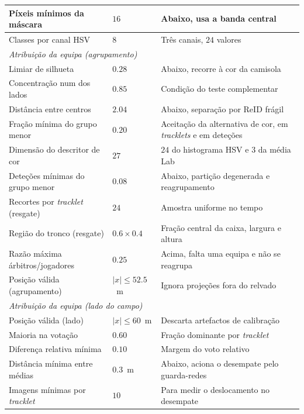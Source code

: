 \begin{table}[htbp]
\begin{tabular}{|l|l|l|}
        \hline
        Píxeis mínimos da máscara    & $16$            & Abaixo, usa a banda central \\
        \hline
        Classes por canal HSV        & $8$             & Três canais, $24$ valores \\
        \hline
        \multicolumn{3}{|l|}{\emph{Atribuição da equipa (agrupamento)}} \\
        \hline
        Limiar de silhueta           & $0.28$          & Abaixo, recorre à cor da camisola \\
        \hline
        Concentração num dos lados   & $0.85$          & Condição do teste complementar \\
        \hline
        Distância entre centros      & $2.04$          & Abaixo, separação por ReID frágil \\
        \hline
        Fração mínima do grupo menor & $0.20$          & Aceitação da alternativa de cor, em \emph{tracklets} e em deteções \\
        \hline
        Dimensão do descritor de cor & $27$            & $24$ do histograma HSV e $3$ da média Lab \\
        \hline
        Deteções mínimas do grupo menor & $0.08$       & Abaixo, partição degenerada e reagrupamento \\
        \hline
        Recortes por \emph{tracklet} (resgate) & $24$  & Amostra uniforme no tempo \\
        \hline
        Região do tronco (resgate)   & $0.6 \times 0.4$ & Fração central da caixa, largura e altura \\
        \hline
        Razão máxima árbitros/jogadores & $0.25$       & Acima, falta uma equipa e não se reagrupa \\
        \hline
        Posição válida (agrupamento) & $|x| \le 52.5$~m & Ignora projeções fora do relvado \\
        \hline
        \multicolumn{3}{|l|}{\emph{Atribuição da equipa (lado do campo)}} \\
        \hline
        Posição válida (lado)        & $|x| \le 60$~m   & Descarta artefactos de calibração \\
        \hline
        Maioria na votação           & $0.60$          & Fração dominante por \emph{tracklet} \\
        \hline
        Diferença relativa mínima    & $0.10$          & Margem do voto relativo \\
        \hline
        Distância mínima entre médias & $0.3$~m        & Abaixo, aciona o desempate pelo guarda-redes \\
        \hline
        Imagens mínimas por \emph{tracklet} & $10$    & Para medir o deslocamento no desempate \\
        \hline
    \end{tabular}
\end{table}


